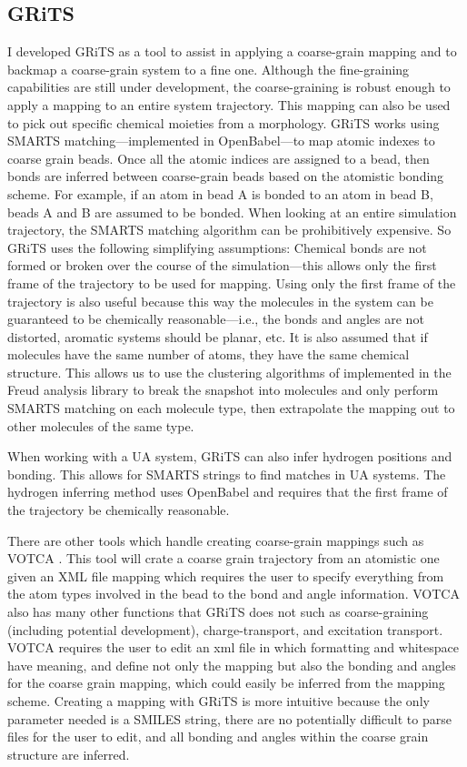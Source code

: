 \subsection{GRiTS}
I developed GRiTS as a tool to assist in applying a coarse-grain mapping and to backmap a coarse-grain system to a fine one. 
Although the fine-graining capabilities are still under development, the coarse-graining is robust enough to apply a mapping to an entire system trajectory. 
This mapping can also be used to pick out specific chemical moieties from a morphology. 
GRiTS works using SMARTS matching---implemented in OpenBabel---to map atomic indexes to coarse grain beads. 
Once all the atomic indices are assigned to a bead, then bonds are inferred between coarse-grain beads based on the atomistic bonding scheme. 
For example, if an atom in bead A is bonded to an atom in bead B, beads A and B are assumed to be bonded. 
When looking at an entire simulation trajectory, the SMARTS matching algorithm can be prohibitively expensive.
So GRiTS uses the following simplifying assumptions: Chemical bonds are not formed or broken over the course of the simulation---this allows only the first frame of the trajectory to be used for mapping. 
Using only the first frame of the trajectory is also useful because this way the molecules in the system can be guaranteed to be chemically reasonable---i.e., the bonds and angles are not distorted, aromatic systems should be planar, etc. 
It is also assumed that if molecules have the same number of atoms, they have the same chemical structure. 
This allows us to use the clustering algorithms of implemented in the Freud analysis library to break the snapshot into molecules and only perform SMARTS matching on each molecule type, then extrapolate the mapping out to other molecules of the same type.

When working with a UA system, GRiTS can also infer hydrogen positions and bonding. This allows for SMARTS strings to find matches in UA systems. The hydrogen inferring method uses OpenBabel and requires that the first frame of the trajectory be chemically reasonable.

There are other tools which handle creating coarse-grain mappings such as VOTCA \citep{Ruhle2009}. 
This tool will crate a coarse grain trajectory from an atomistic one given an XML file mapping which requires the user to specify everything from the atom types involved in the bead to the bond and angle information.
VOTCA also has many other functions that GRiTS does not such as coarse-graining (including potential development), charge-transport, and excitation transport.
VOTCA requires the user to edit an xml file in which formatting and whitespace have meaning, and define not only the mapping but also the bonding and angles for the coarse grain mapping, which could easily be inferred from the mapping scheme.
Creating a mapping with GRiTS is more intuitive because the only parameter needed is a SMILES string, there are no potentially difficult to parse files for the user to edit, and all bonding and angles within the coarse grain structure are inferred.

